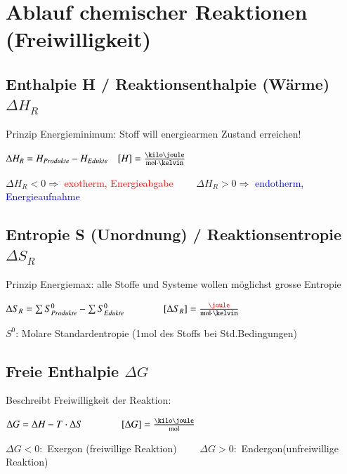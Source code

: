 \section{Ablauf chemischer Reaktionen (Freiwilligkeit)}

\subsection{Enthalpie H / Reaktionsenthalpie (Wärme) $\Delta H_R$}
    Prinzip Energieminimum: Stoff will energiearmen Zustand erreichen!

    $\Delta H_R = H_{Produkte} - H_{Edukte} \quad [H] = \frac{\kilo\joule}{\mol \cdot \kelvin}$

    $\Delta H_R < 0 \Rightarrow$ \textcolor{red}{exotherm, Energieabgabe} $\qquad \Delta H_R > 0 \Rightarrow$ \textcolor{blue}{endotherm, Energieaufnahme}

\subsection{Entropie S (Unordnung) / Reaktionsentropie $\Delta S_R$}
    Prinzip Energiemax: alle Stoffe und Systeme wollen möglichst grosse Entropie

    $\Delta S_R = \sum S^0_{Produkte} - \sum S^0_{Edukte} \qquad \qquad [\Delta S_R] = \frac{\color{red}\joule}{\mol \cdot \kelvin}$

    $S^0$: Molare Standardentropie (1mol des Stoffs bei Std.Bedingungen)
\subsection{Freie Enthalpie $\Delta G$}
    Beschreibt Freiwilligkeit der Reaktion:

    $\Delta G = \Delta H - T \cdot \Delta S \qquad \qquad [\Delta G] = \frac{\kilo\joule}{\mol}$

    $\Delta G < 0:$ Exergon (freiwillige Reaktion) $\qquad \Delta G > 0:$ Endergon(unfreiwillige Reaktion)


